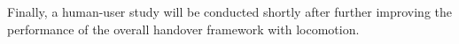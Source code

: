 
Finally, a human-user study will be conducted shortly after further improving the performance of the overall handover framework with locomotion.






\clearpage %




%
%




